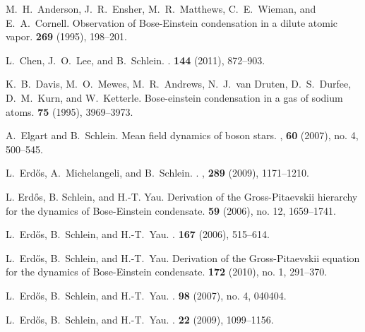 \documentclass[11pt,a4paper]{article}
\newcommand{\done}{}
\begin{document}
\begin{thebibliography}{10}

\bibitem{BEC1}\done{}
M.~H.~Anderson, J.~R.~Ensher, M.~R.~Matthews, C.~E.~Wieman, and E.~A.~Cornell.
\newblock Observation of {B}ose-{E}instein condensation in a dilute atomic vapor.
 {\bf 269} (1995), 198--201.

L.~{Chen}, J.~O.~{Lee}, and B.~{Schlein}.
.
 {\bf 144} (2011), 872--903.

K.~B.~Davis, M.~O.~Mewes, M.~R.~Andrews, N.~J.~van Druten, D.~S.~Durfee, D.~M.~Kurn, and W.~Ketterle.
\newblock Bose-einstein condensation in a gas of sodium atoms.
 {\bf 75} (1995), 3969--3973.

A.~Elgart and B.~Schlein.
\newblock Mean field dynamics of boson stars.
, {\bf 60} (2007), no. 4, 500--545.

L.~{Erd{\H o}s}, A.~{Michelangeli}, and B.~{Schlein}.
.
, {\bf 289} (2009), 1171--1210.

L. Erd{\H{o}}s, B. Schlein, and H.-T. Yau.
\newblock Derivation of the {G}ross-{P}itaevskii hierarchy for the dynamics of
  {B}ose-{E}instein condensate.
 {\bf 59} (2006), no. 12, 1659--1741.

L.~{Erd{\H o}s}, B.~{Schlein}, and H.-T.~{Yau}.
.
 {\bf 167} (2006), 515--614.

L.~Erd{\H{o}}s, B.~Schlein, and H.-T.~Yau.
\newblock Derivation of the {G}ross-{P}itaevskii equation for the dynamics of
  {B}ose-{E}instein condensate.
 {\bf 172} (2010), no. 1, 291--370.

L.~{Erd{\H o}s}, B.~{Schlein}, and H.-T.~{Yau}.
.
 {\bf 98} (2007), no. 4, 040404.

L.~{Erd{\H o}s}, B.~{Schlein}, and H.-T.~{Yau}.
.
 {\bf 22} (2009), 1099--1156.
  

\end{thebibliography}
\end{document}
